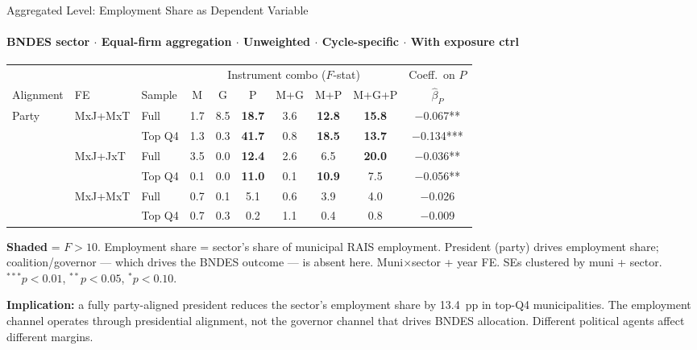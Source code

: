 \documentclass[aspectratio=169,10pt]{beamer}
\newcommand{\fpass}[1]{\cellcolor{pass}\textbf{#1}}
\begin{document}
\begin{frame}[t]{Aggregated Level: Employment Share as Dependent Variable}
\framesubtitle{BNDES sector $\cdot$ Equal-firm aggregation $\cdot$ Unweighted $\cdot$ Cycle-specific $\cdot$ With exposure ctrl}
\begin{center}
\footnotesize
\setlength{\tabcolsep}{3.5pt}
\renewcommand{\arraystretch}{1.05}
\begin{tabular}{@{}lllccccccc@{}}
\toprule
 & & & \multicolumn{6}{c}{Instrument combo ($F$-stat)} & Coeff.\ on $P$ \\
\cmidrule(l{2pt}r{2pt}){4-9}
Alignment & FE & Sample & M & G & P & M+G & M+P & M+G+P & $\hat\beta_P$ \\
\midrule
\multirow{2}{*}{Party}
  & \multirow{2}{*}{MxJ+MxT}
  & Full     & 1.7 & 8.5          & \fpass{18.7} & 3.6          & \fpass{12.8} & \fpass{15.8} & $-$0.067** \\
  &  & Top Q4  & 1.3 & 0.3          & \fpass{41.7} & 0.8          & \fpass{18.5} & \fpass{13.7} & $-$0.134*** \\
\addlinespace[3pt]
\multirow{2}{*}{Party}
  & \multirow{2}{*}{MxJ+JxT}
  & Full     & 3.5 & 0.0          & \fpass{12.4} & 2.6          & 6.5          & \fpass{20.0} & $-$0.036** \\
  &  & Top Q4  & 0.1 & 0.0          & \fpass{11.0} & 0.1          & \fpass{10.9} & 7.5          & $-$0.056** \\
\addlinespace[3pt]
\multirow{2}{*}{Coalition}
  & \multirow{2}{*}{MxJ+MxT}
  & Full     & 0.7 & 0.1          & 5.1          & 0.6          & 3.9          & 4.0          & $-$0.026 \\
  &  & Top Q4  & 0.7 & 0.3          & 0.2          & 1.1          & 0.4          & 0.8          & $-$0.009 \\
\bottomrule
\end{tabular}
\end{center}
{\scriptsize \colorbox{pass}{\textbf{Shaded}} = $F>10$.
Employment share = sector's share of municipal RAIS employment.
President (party) drives employment share; coalition/governor --- which drives the BNDES outcome --- is absent here.
Muni$\times$sector + year FE.  SEs clustered by muni + sector.  $^{***}p<0.01$, $^{**}p<0.05$, $^{*}p<0.10$.}

\vspace{0.2em}
\textcolor{alertred}{\footnotesize\textbf{Implication:} a fully party-aligned president reduces the sector's employment share by 13.4~pp in top-Q4 municipalities.  The employment channel operates through presidential alignment, not the governor channel that drives BNDES allocation.  Different political agents affect different margins.}
\end{frame}
\end{document}
